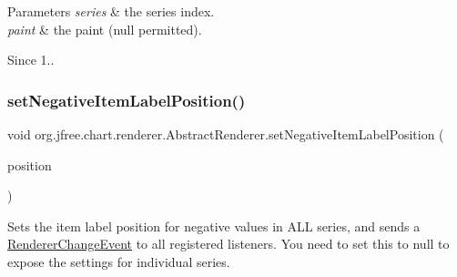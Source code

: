 \begin{DoxyParams}{Parameters}
{\em series} & the series index. \\
\hline
{\em paint} & the paint ({\ttfamily null} permitted).\\
\hline
\end{DoxyParams}
\begin{DoxySince}{Since}
1.. 
\end{DoxySince}
\mbox{\label{classorg_1_1jfree_1_1chart_1_1renderer_1_1_abstract_renderer_a24fd71d04b101f4636e57eb2d5e60b61}} 
\subsubsection{\texorpdfstring{set\+Negative\+Item\+Label\+Position()}{setNegativeItemLabelPosition()}\hspace{0.1cm}{\footnotesize\ttfamily [1/2]}}
{\footnotesize\ttfamily void org.\+jfree.\+chart.\+renderer.\+Abstract\+Renderer.\+set\+Negative\+Item\+Label\+Position (\begin{DoxyParamCaption}\item[{\mbox{\hyperlink{classorg_1_1jfree_1_1chart_1_1labels_1_1_item_label_position}{Item\+Label\+Position}}}]{position }\end{DoxyParamCaption})}

Sets the item label position for negative values in A\+LL series, and sends a \mbox{\hyperlink{}{Renderer\+Change\+Event}} to all registered listeners. You need to set this to {\ttfamily null} to expose the settings for individual series.


